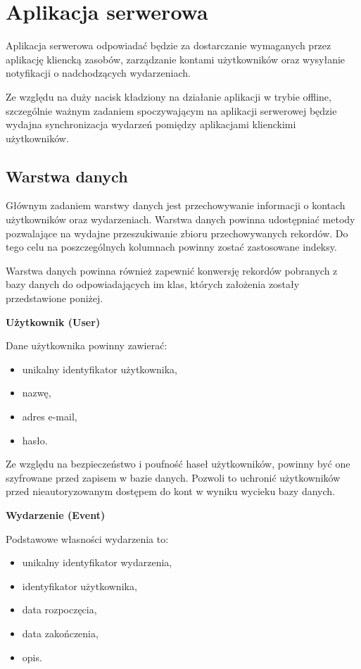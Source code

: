\section{Aplikacja serwerowa}
\label{sec:appSerw}

Aplikacja serwerowa odpowiadać będzie za dostarczanie wymaganych przez aplikację kliencką zasobów, zarządzanie kontami użytkowników oraz wysyłanie notyfikacji o nadchodzących wydarzeniach.

Ze względu na duży nacisk kładziony na działanie aplikacji w trybie offline, szczególnie ważnym zadaniem spoczywającym na aplikacji serwerowej będzie wydajna synchronizacja wydarzeń pomiędzy aplikacjami klienckimi użytkowników.

\subsection{Warstwa danych}
\label{warstwaDanych}

Głównym zadaniem warstwy danych jest przechowywanie informacji o kontach użytkowników oraz wydarzeniach. Warstwa danych powinna udostępniać metody pozwalające na wydajne przeszukiwanie zbioru przechowywanych rekordów. Do tego celu na poszczególnych kolumnach powinny zostać zastosowane indeksy. 

Warstwa danych powinna również zapewnić konwersję rekordów pobranych z bazy danych do odpowiadających im klas, których założenia zostały przedstawione poniżej.

\textbf{Użytkownik (User)}

Dane użytkownika powinny zawierać:

\begin{itemize}
\item unikalny identyfikator użytkownika,
\item nazwę,
\item adres e-mail,
\item hasło.
\end{itemize}

Ze względu na bezpieczeństwo i poufność haseł użytkowników, powinny być one szyfrowane przed zapisem w bazie danych. Pozwoli to uchronić użytkowników przed nieautoryzowanym dostępem do kont w wyniku wycieku bazy danych.

\textbf{Wydarzenie (Event)}

Podstawowe własności wydarzenia to:

\begin{itemize}
\item unikalny identyfikator wydarzenia,
\item identyfikator użytkownika,
\item data rozpoczęcia,
\item data zakończenia,
\item opis.
\end{itemize}

